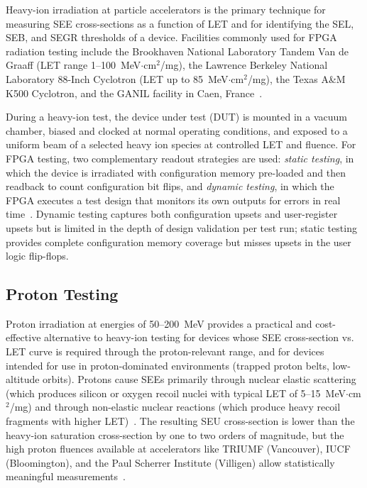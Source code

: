 Heavy-ion irradiation at particle accelerators is the primary
technique for measuring SEE cross-sections as a function of LET
and for identifying the SEL, SEB, and SEGR thresholds of a device.
Facilities commonly used for FPGA radiation testing include the
Brookhaven National Laboratory Tandem Van de Graaff (LET range
1--100~MeV$\cdot$cm$^2$/mg), the Lawrence Berkeley National
Laboratory 88-Inch Cyclotron (LET up to 85~MeV$\cdot$cm$^2$/mg),
the Texas A\&M K500 Cyclotron, and the GANIL facility in
Caen, France~\cite{natacad2018testing}.

During a heavy-ion test, the device under test (DUT) is mounted
in a vacuum chamber, biased and clocked at normal operating
conditions, and exposed to a uniform beam of a selected heavy
ion species at controlled LET and fluence.  For FPGA testing,
two complementary readout strategies are used: \emph{static
testing}, in which the device is irradiated with configuration
memory pre-loaded and then readback to count configuration bit
flips, and \emph{dynamic testing}, in which the FPGA executes
a test design that monitors its own outputs for errors in
real time~\cite{quinn2007review}.  Dynamic testing captures
both configuration upsets and user-register upsets but is limited
in the depth of design validation per test run; static testing
provides complete configuration memory coverage but misses
upsets in the user logic flip-flops.

\subsection{Proton Testing}

Proton irradiation at energies of 50--200~MeV provides a
practical and cost-effective alternative to heavy-ion testing
for devices whose SEE cross-section vs. LET curve is required
through the proton-relevant range, and for devices intended for
use in proton-dominated environments (trapped proton belts,
low-altitude orbits).  Protons cause SEEs primarily through
nuclear elastic scattering (which produces silicon or oxygen
recoil nuclei with typical LET of 5--15~MeV$\cdot$cm$^2$/mg)
and through non-elastic nuclear reactions (which produce heavy
recoil fragments with higher LET)~\cite{petersen1992rate}.
The resulting SEU cross-section is lower than the heavy-ion
saturation cross-section by one to two orders of magnitude,
but the high proton fluences available at accelerators like
TRIUMF (Vancouver), IUCF (Bloomington), and the Paul Scherrer
Institute (Villigen) allow statistically meaningful
measurements~\cite{schwank2013radiation}.

